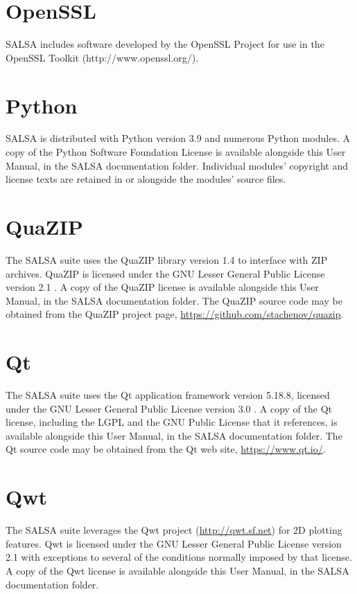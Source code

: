 \section*{OpenSSL}
SALSA includes software developed by the OpenSSL Project for use in the OpenSSL Toolkit (http://www.openssl.org/).

\section*{Python}
SALSA is distributed with Python version 3.9 and numerous Python modules.  A copy of the Python Software Foundation License is available alongside this User Manual, in the SALSA documentation folder.  Individual modules' copyright and license texts are retained in or alongside the modules' source files.

\section*{QuaZIP}
The SALSA suite uses the QuaZIP library version 1.4 to interface with ZIP archives.  QuaZIP is licensed under the GNU Lesser General Public License version 2.1 \cite{LGPL21}.  A copy of the QuaZIP license is available alongside this User Manual, in the SALSA documentation folder. The QuaZIP source code may be obtained from the QuaZIP project page, \url{https://github.com/stachenov/quazip}.

\section*{Qt}
The SALSA suite uses the Qt application framework \cite{Qt} version 5.18.8, licensed under the GNU Lesser General Public License version 3.0 \cite{LGPL}.  A copy of the Qt license, including the LGPL and the GNU Public License that it references, is available alongside this User Manual, in the SALSA documentation folder. The Qt source code may be obtained from the Qt web site, \url{https://www.qt.io/}.

\section*{Qwt}
The SALSA suite leverages the Qwt project (\url{http://qwt.sf.net}) for 2D plotting features. Qwt is licensed under the GNU Lesser General Public License version 2.1 \cite{LGPL21} with exceptions to several of the conditions normally imposed by that license.  A copy of the Qwt license is available alongside this User Manual, in the SALSA documentation folder.